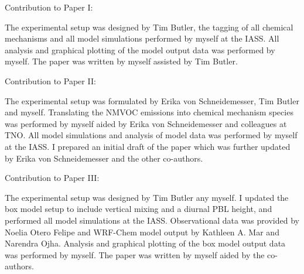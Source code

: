 \noindent
Contribution to Paper I:

The experimental setup was designed by Tim Butler, the tagging of all chemical mechanisms and all model simulations performed by myself at the IASS.
All analysis and graphical plotting of the model output data was performed by myself.
The paper was written by myself assisted by Tim Butler.

\noindent
Contribution to Paper II:

The experimental setup was formulated by Erika von Schneidemesser, Tim Butler and myself.
Translating the NMVOC emissions into chemical mechanism species was performed by myself aided by Erika von Schneidemesser and colleagues at TNO.
All model simulations and analysis of model data was performed by myself at the IASS.
I prepared an initial draft of the paper which was further updated by Erika von Schneidemesser and the other co-authors.

\noindent
Contribution to Paper III:

The experimental setup was designed by Tim Butler any myself.
I updated the box model setup to include vertical mixing and a diurnal PBL height, and performed all model simulations at the IASS.
Observational data was provided by Noelia Otero Felipe and WRF-Chem model output by Kathleen A. Mar and Narendra Ojha.
Analysis and graphical plotting of the box model output data was performed by myself.
The paper was written by myself aided by the co-authors.
